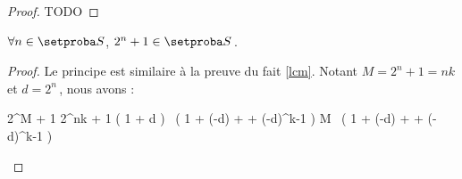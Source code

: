 \begin{proof}
	TODO
\end{proof}




\begin{fact}
	$\forall n \in \ourset$, $2^n + 1 \in \ourset$\,.
\end{fact}

\begin{proof}
	Le principe est similaire à la preuve du fait \ref{lcm}.
	Notant $M = 2^n + 1 = n k$ et $d = 2^n$\,, nous avons :

	\medskip
	
	\begin{stepcalc}[style = sar]
		2^M + 1
	\explnext{}
		2^{nk} + 1
	\explnext{}
		\big( 1 + d \big) \, \big( 1 + (-d) + \cdots + (-d)^{k-1} \big)
	\explnext{}
		M \, \big( 1 + (-d) + \cdots + (-d)^{k-1} \big)
	\end{stepcalc}
\end{proof}

